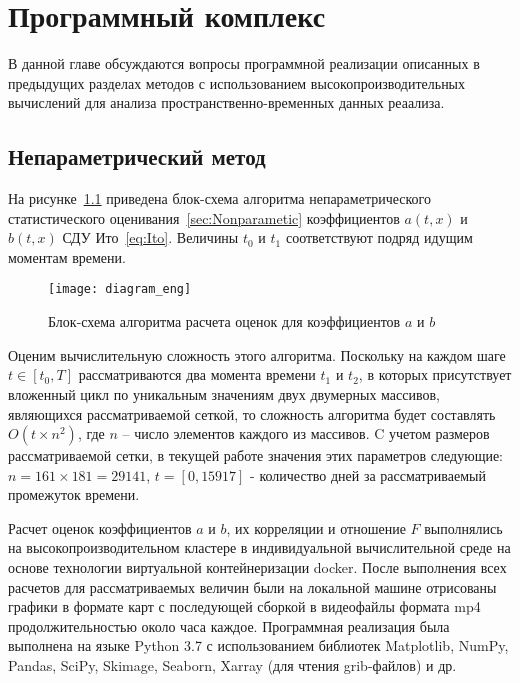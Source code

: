 \chapter{Программный комплекс}
\label{ch:Algorithms}
В данной главе обсуждаются вопросы программной реализации описанных в предыдущих разделах методов с использованием высокопроизводительных вычислений для анализа пространственно-временных данных реаализа.
\section{Непараметрический метод}
 На рисунке~\ref{fig:algo_nonparametric} приведена блок-схема алгоритма непараметрического статистического оценивания~\ref{sec:Nonparametic} коэффициентов $a(t,x)$ и $b(t,x)$ СДУ  Ито~\eqref{eq:Ito}. Величины $t_0$ и $t_1$ соответствуют подряд идущим моментам времени. 

\begin{figure}[!h]
	\centering
	\texttt{[image: diagram\_eng]}
	\caption{Блок-схема алгоритма расчета оценок для коэффициентов $a$ и $b$} \label{fig:algo_nonparametric}
\end{figure}


Оценим вычислительную сложность этого алгоритма. Поскольку на каждом шаге $t \in [t_0,T]$ рассматриваются два момента времени $t_1$ и $t_2$, в которых присутствует вложенный цикл по уникальным значениям двух двумерных массивов, являющихся рассматриваемой сеткой, то сложность алгоритма будет составлять $O(t\times n^2)$, где $n$ – число элементов каждого из массивов. C учетом размеров рассматриваемой сетки, в текущей работе значения этих параметров следующие: $n=161\times181=29141$, $t = [0, 15917]$ - количество дней за рассматриваемый промежуток времени.


Расчет оценок коэффициентов $a$ и $b$, их корреляции и отношение $F$ выполнялись на высокопроизводительном кластере в индивидуальной вычислительной среде на основе технологии виртуальной контейнеризации docker. После выполнения всех расчетов для рассматриваемых величин были на локальной машине отрисованы графики в формате карт с последующей сборкой в видеофайлы формата mp4 продолжительностью около часа каждое.  
Программная реализация была выполнена на языке Python 3.7 с использованием библиотек Matplotlib, NumPy, Pandas, SciPy, Skimage, Seaborn, Xarray (для чтения grib-файлов) и др.

